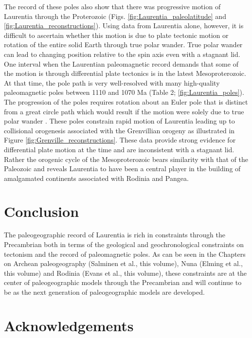 \documentclass[11pt,letterpaper]{article}
\begin{document}
The record of these poles also show that there was progressive motion of Laurentia through the Proterozoic (Figs. \ref{fig:Laurentia_paleolatitude} and \ref{fig:Laurentia_reconstructions}). Using data from Laurentia alone, however, it is difficult to ascertain whether this motion is due to plate tectonic motion or rotation of the entire solid Earth through true polar wander. True polar wander can lead to changing position relative to the spin axis even with a stagnant lid. One interval when the Laurentian paleomagnetic record demands that some of the motion is through differential plate tectonics is in the latest Mesoproterozoic. At that time, the pole path is very well-resolved with many high-quality paleomagnetic poles between 1110 and 1070 Ma (Table 2; \ref{fig:Laurentia_poles}). The progression of the poles requires rotation about an Euler pole that is distinct from a great circle path which would result if the motion were solely due to true polar wander \citep{Swanson-Hysell2019a}. These poles constrain rapid motion of Laurentia leading up to collisional orogenesis associated with the Grenvillian orogeny as illustrated in Figure \ref{fig:Grenville_reconstructions}. These data provide strong evidence for differential plate motion at the time and are inconsistent with a stagnant lid. Rather the orogenic cycle of the Mesoproterozoic bears similarity with that of the Paleozoic and reveals Laurentia to have been a central player in the building of amalgamated continents associated with Rodinia and Pangea. 

\section{Conclusion}

The paleogeographic record of Laurentia is rich in constraints through the Precambrian both in terms of the geological and geochronological constraints on tectonism and the record of paleomagnetic poles. As can be seen in the Chapters on Archean paleogeography (Salminen et al., this volume), Nuna (Elming et al., this volume) and Rodinia (Evans et al., this volume), these constraints are at the center of paleogeographic models through the Precambrian and will continue to be as the next generation of paleogeographic models are developed.

\section*{Acknowledgements}
\end{document}
